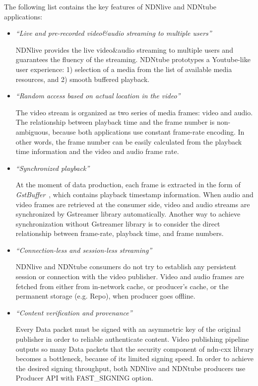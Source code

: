The following list contains the key features of NDNlive and NDNtube applications:
\begin{itemize}
\item{\textit{``Live and pre-recorded video\&audio streaming to multiple users''}}

NDNlive provides the live video\&audio streaming to multiple users and guarantees the fluency of the streaming. NDNtube prototypes a Youtube-like user experience: 1) selection of a media from the list of available media resources, and 2) smooth buffered playback. 

\item{\textit{``Random access based on actual location in the video''}}

The video stream is organized as two series of media frames: video and audio. The relationship between playback time and the frame number is non-ambiguous, because both applications use constant frame-rate encoding. In other words, the frame number can be easily calculated from the playback time information and the video and audio frame rate. 

\textbf{ }

\item{\textit{``Synchronized playback''}}

At the moment of data production, each frame is extracted in the form of \textit{GstBuffer}~\cite{Gstbuffer}, which contains playback timestamp information. When audio and video frames are retrieved at the consumer side, video and audio streams are synchronized by Gstreamer library automatically. Another way to achieve synchronization without Gstreamer library is to consider the direct relationship between frame-rate, playback time, and frame numbers.

\item{\textit{``Connection-less and session-less streaming''}}

NDNlive and NDNtube consumers do not try to establish any persistent session or connection with the video publisher. Video and audio frames are fetched from either from in-network cache, or producer's cache, or the permanent storage (e.g. Repo), when producer goes offline.



\item{\textit{``Content verification and provenance''}}

Every Data packet must be signed with an asymmetric key of the original publisher in order to reliable authenticate content. Video publishing pipeline outputs so many Data packets that the security component of ndn-cxx library becomes a bottleneck, because of its limited signing speed. In order to achieve the desired signing throughput, both NDNlive and NDNtube producers use Producer API with FAST\_SIGNING option.

\end{itemize} 

